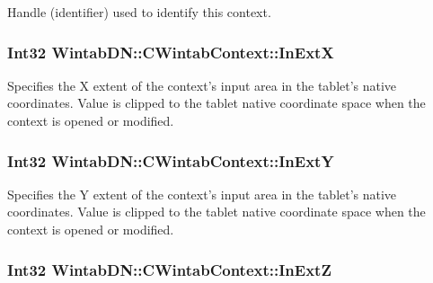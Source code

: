 Handle (identifier) used to identify this context. 

\hypertarget{class_wintab_d_n_1_1_c_wintab_context_a4617fa32c1cfde4a434adb410d5fa20f}{
\subsubsection[{InExtX}]{\setlength{\rightskip}{0pt plus 5cm}Int32 WintabDN::CWintabContext::InExtX}}
\label{class_wintab_d_n_1_1_c_wintab_context_a4617fa32c1cfde4a434adb410d5fa20f}


Specifies the X extent of the context's input area in the tablet's native coordinates. Value is clipped to the tablet native coordinate space when the context is opened or modified. 

\hypertarget{class_wintab_d_n_1_1_c_wintab_context_a98483a97a67cf1c9ddf42ba0d3344830}{
\subsubsection[{InExtY}]{\setlength{\rightskip}{0pt plus 5cm}Int32 WintabDN::CWintabContext::InExtY}}
\label{class_wintab_d_n_1_1_c_wintab_context_a98483a97a67cf1c9ddf42ba0d3344830}


Specifies the Y extent of the context's input area in the tablet's native coordinates. Value is clipped to the tablet native coordinate space when the context is opened or modified. 

\hypertarget{class_wintab_d_n_1_1_c_wintab_context_a69434687517c9e50421ea2be7dcb7c7e}{
\subsubsection[{InExtZ}]{\setlength{\rightskip}{0pt plus 5cm}Int32 WintabDN::CWintabContext::InExtZ}}
\label{class_wintab_d_n_1_1_c_wintab_context_a69434687517c9e50421ea2be7dcb7c7e}


